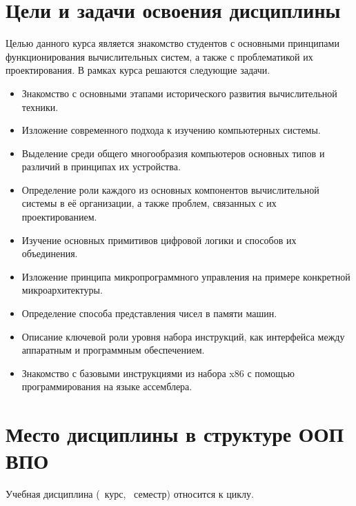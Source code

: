 






\section{Цели и задачи освоения дисциплины}

Целью данного курса является знакомство студентов с основными принципами функционирования вычислительных систем, а также с проблематикой их проектирования. В рамках курса решаются следующие задачи.
\begin{itemize}
	\item Знакомство с основными этапами исторического развития вычислительной техники.
	\item Изложение современного подхода к изучению компьютерных системы.
	\item Выделение среди общего многообразия компьютеров основных типов и различий в принципах их устройства.
	\item Определение роли каждого из основных компонентов вычислительной системы в её организации, а также проблем, связанных с их проектированием.
	\item Изучение основных примитивов цифровой логики и способов их объединения.
	\item Изложение принципа микропрограммного управления на примере конкретной микроархитектуры.
	\item Определение способа представления чисел в памяти машин.
	\item Описание ключевой роли уровня набора инструкций, как интерфейса между аппаратным и программным обеспечением.
	\item Знакомство с базовыми инструкциями из набора x86 с помощью программирования на языке ассемблера.
\end{itemize}

\section{Место дисциплины в структуре ООП ВПО}


	\ssect Учебная дисциплина \thecourse{}
(\theyearofstudy~курс, \theterm~семестр) относится к  циклу.

